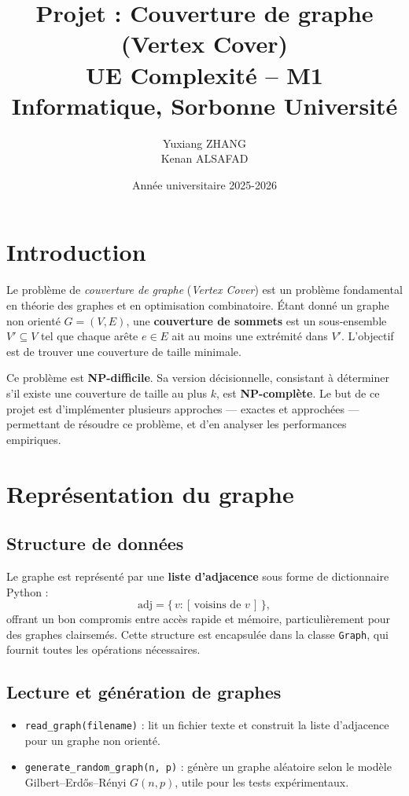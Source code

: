 \documentclass[11pt,a4paper]{article}
\title{Projet : Couverture de graphe (Vertex Cover)\\
UE Complexité -- M1 Informatique, Sorbonne Université}
\author{Yuxiang ZHANG \\ Kenan ALSAFAD}
\date{Année universitaire 2025-2026}
\begin{document}
\maketitle

\section{Introduction}

Le problème de \textit{couverture de graphe} (\textit{Vertex Cover}) est un problème fondamental en théorie des graphes et en optimisation combinatoire.  
Étant donné un graphe non orienté $G = (V, E)$, une \textbf{couverture de sommets} est un sous-ensemble $V' \subseteq V$ tel que chaque arête $e \in E$ ait au moins une extrémité dans $V'$.  
L'objectif est de trouver une couverture de taille minimale.

Ce problème est \textbf{NP-difficile}. Sa version décisionnelle, consistant à déterminer s'il existe une couverture de taille au plus $k$, est \textbf{NP-complète}.  
Le but de ce projet est d'implémenter plusieurs approches — exactes et approchées — permettant de résoudre ce problème, et d'en analyser les performances empiriques.

\section{Représentation du graphe}

\subsection{Structure de données}
Le graphe est représenté par une \textbf{liste d’adjacence} sous forme de dictionnaire Python :
\[
\text{adj} = \{\,v : [\,\text{voisins de } v\,]\,\},
\]
offrant un bon compromis entre accès rapide et mémoire, particulièrement pour des graphes clairsemés.  
Cette structure est encapsulée dans la classe \texttt{Graph}, qui fournit toutes les opérations nécessaires.

\subsection{Lecture et génération de graphes}
\begin{itemize}
    \item \texttt{read\_graph(filename)} : lit un fichier texte et construit la liste d’adjacence pour un graphe non orienté.
    \item \texttt{generate\_random\_graph(n, p)} : génère un graphe aléatoire selon le modèle Gilbert–Erdős–Rényi $G(n,p)$, utile pour les tests expérimentaux.
\end{itemize}
\end{document}
